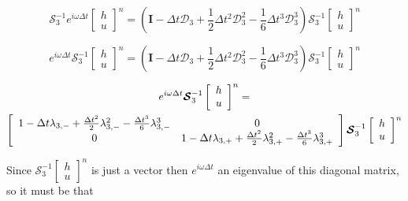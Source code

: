 \documentclass[12pt]{article}
\begin{document}
\[\boldsymbol{\mathcal{S}}_3^{-1} e^{i\omega \Delta t}\left[\begin{array}{c}
h \\ u
\end{array}\right]^{n} = \left(\boldsymbol{I} -  \Delta t \boldsymbol{\mathcal{D}}_3   + \frac{1}{2}\Delta t^2 \boldsymbol{\mathcal{D}}_3^2- \frac{1}{6}\Delta t^3 \boldsymbol{\mathcal{D}}_3^3 \right) \boldsymbol{\mathcal{S}}_3^{-1}\left[\begin{array}{c}
h \\ u
\end{array}\right]^n\]

\[e^{i\omega \Delta t}\boldsymbol{\mathcal{S}}_3^{-1}\left[\begin{array}{c}
h \\ u
\end{array}\right]^{n} = \left(\boldsymbol{I} -  \Delta t \boldsymbol{\mathcal{D}}_3   + \frac{1}{2}\Delta t^2 \boldsymbol{\mathcal{D}}_3^2- \frac{1}{6}\Delta t^3 \boldsymbol{\mathcal{D}}_3^3 \right) \boldsymbol{\mathcal{S}}_3^{-1}\left[\begin{array}{c}
h \\ u
\end{array}\right]^n\]

\begin{multline}
e^{i\omega \Delta t}\boldsymbol{\mathcal{S}}_3^{-1}\left[\begin{array}{c}
h \\ u
\end{array}\right]^{n} = \\ \left[\begin{array}{c c}
1 - \Delta t \lambda_{3,-} + \frac{\Delta t^2}{2} \lambda_{3,-}^2 - \frac{\Delta t^3}{6} \lambda_{3,-}^3  & 0 \\0  & 1 - \Delta t \lambda_{3,+} + \frac{\Delta t^2}{2} \lambda_{3,+}^2 - \frac{\Delta t^3}{6} \lambda_{3,+}^3
\end{array}\right] \boldsymbol{\mathcal{S}}_3^{-1}\left[\begin{array}{c}
h \\ u
\end{array}\right]^n
\end{multline}

Since $\boldsymbol{\mathcal{S}}_3^{-1}\left[\begin{array}{c}
h \\ u
\end{array}\right]^n$ is just a vector then $e^{i\omega\Delta t}$ an eigenvalue of this diagonal matrix, so it must be that
\end{document}
